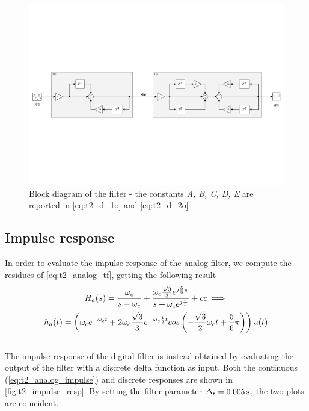 \\
\begin{figure} [H]
	\centering
	\includegraphics[trim={0cm 7.5cm 0cm 7.5cm}, clip, width=\linewidth]{block_diagram}
	\caption{Block diagram of the filter - the constants \textit{A, B, C, D, E} are reported in \cref{eq:t2_d_1o} and \cref{eq:t2_d_2o}}
	\label{fig:t2_block_diagram}
\end{figure}


\subsection{Impulse response}
In order to evaluate the impulse response of the analog filter, we compute the residues of \cref{eq:t2_analog_tf}, getting the following result
\begin{gather}
H_a(s)=\frac{\omega_c}{s+\omega_c}+\frac{\omega_c \frac{\sqrt 3}{3} e^{j \frac{5 }{6}\pi}}{s+\omega_c e^{j \frac{\pi}{3}}} + cc \implies \nonumber \\
h_a(t)=\left(\omega_c e^{-\omega_c t} + 2 \omega_c \frac{\sqrt 3}{3} e^{-\omega_c \frac{1}{2} t}  cos\left(-\frac{\sqrt 3}{2} \omega_c t + \frac{5}{6} \pi\right)\right) u (t) \label{eq:t2_analog_impulse}
\end{gather}
\\
The impulse response of the digital filter is instead obtained by evaluating the output of the filter with a discrete delta function as input.
Both the continuous (\cref{eq:t2_analog_impulse}) and discrete responses are shown in \cref{fig:t2_impulse_resp}. By setting the filter parameter $\Delta_t=\SI{0.005}{s}$, the two plots are coincident.

